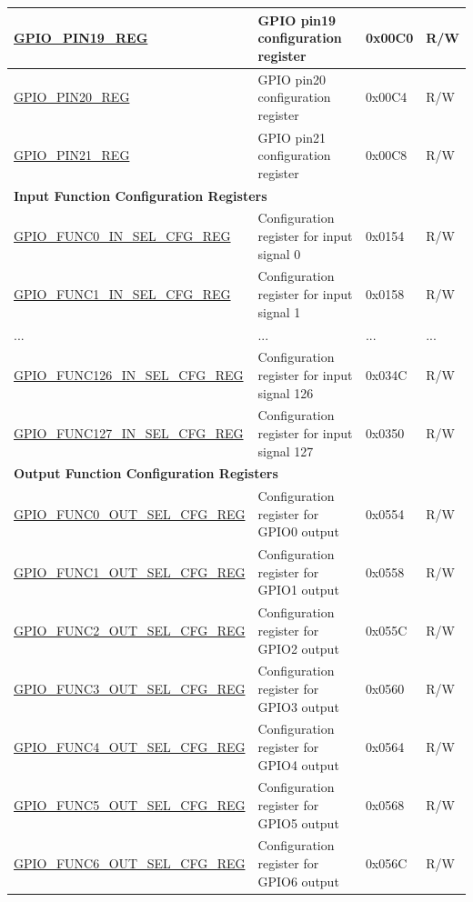 \begin{longtable}{ | p{6cm} | p{7.2cm} | p{1.3cm} | p{1cm} | }
\hyperref[regdesc:GPIOPINNREG]{GPIO\_PIN19\_REG} & GPIO pin19 configuration register & 0x00C0 & R/W \\ \hline
\hyperref[regdesc:GPIOPINNREG]{GPIO\_PIN20\_REG} & GPIO pin20 configuration register & 0x00C4 & R/W \\ \hline
\hyperref[regdesc:GPIOPINNREG]{GPIO\_PIN21\_REG} & GPIO pin21 configuration register & 0x00C8 & R/W \\ \hline
\multicolumn{4}{|l|}{\textbf{Input Function Configuration Registers}} \\ \hline
\hyperref[regdesc:GPIOFUNCNINSELCFGREG]{GPIO\_FUNC0\_IN\_SEL\_CFG\_REG} & Configuration register for input signal 0 & 0x0154 & R/W \\ \hline
\hyperref[regdesc:GPIOFUNCNINSELCFGREG]{GPIO\_FUNC1\_IN\_SEL\_CFG\_REG} & Configuration register for input signal 1 & 0x0158 & R/W \\ \hline
...& ... & ... & ... \\ \hline
\hyperref[regdesc:GPIOFUNCNINSELCFGREG]{GPIO\_FUNC126\_IN\_SEL\_CFG\_REG} & Configuration register for input signal 126 & 0x034C & R/W \\ \hline
\hyperref[regdesc:GPIOFUNCNINSELCFGREG]{GPIO\_FUNC127\_IN\_SEL\_CFG\_REG} & Configuration register for input signal 127 & 0x0350 & R/W \\ \hline
\multicolumn{4}{|l|}{\textbf{Output Function Configuration Registers}} \\ \hline
\hyperref[regdesc:GPIOFUNCNOUTSELCFGREG]{GPIO\_FUNC0\_OUT\_SEL\_CFG\_REG} & Configuration register for GPIO0 output& 0x0554 & R/W \\ \hline
\hyperref[regdesc:GPIOFUNCNOUTSELCFGREG]{GPIO\_FUNC1\_OUT\_SEL\_CFG\_REG} & Configuration register for GPIO1 output & 0x0558 & R/W \\ \hline
\hyperref[regdesc:GPIOFUNCNOUTSELCFGREG]{GPIO\_FUNC2\_OUT\_SEL\_CFG\_REG} & Configuration register for GPIO2 output & 0x055C & R/W \\ \hline
\hyperref[regdesc:GPIOFUNCNOUTSELCFGREG]{GPIO\_FUNC3\_OUT\_SEL\_CFG\_REG} & Configuration register for GPIO3 output & 0x0560 & R/W \\ \hline
\hyperref[regdesc:GPIOFUNCNOUTSELCFGREG]{GPIO\_FUNC4\_OUT\_SEL\_CFG\_REG} & Configuration register for GPIO4 output & 0x0564 & R/W \\ \hline
\hyperref[regdesc:GPIOFUNCNOUTSELCFGREG]{GPIO\_FUNC5\_OUT\_SEL\_CFG\_REG} & Configuration register for GPIO5 output & 0x0568 & R/W \\ \hline
\hyperref[regdesc:GPIOFUNCNOUTSELCFGREG]{GPIO\_FUNC6\_OUT\_SEL\_CFG\_REG} & Configuration register for GPIO6 output & 0x056C & R/W \\ \hline

\end{longtable}
